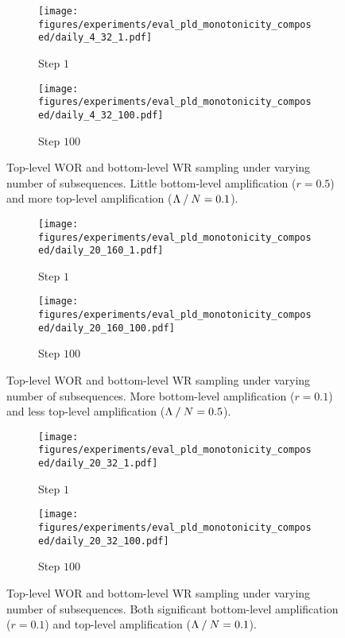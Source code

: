 \begin{figure*}[!ht]
\centering
\vskip 0.2in
    \begin{subfigure}{0.49\textwidth}
        \texttt{[image: figures/experiments/eval\_pld\_monotonicity\_composed/daily\_4\_32\_1.pdf]}
        \caption{Step $1$}
    \end{subfigure}
    \hfill
    \begin{subfigure}{0.49\textwidth}
        \texttt{[image: figures/experiments/eval\_pld\_monotonicity\_composed/daily\_4\_32\_100.pdf]}
        \caption{Step $100$}
    \end{subfigure}\caption{Top-level WOR and bottom-level WR sampling under varying number of subsequences.
    Little bottom-level amplification ($r = 0.5$) and more top-level amplification
    ($\Lambda \mathbin{/} N = 0.1$).
    }
    \label{fig:monotonicity_daily_appendix_container_1}
\vskip -0.2in
\end{figure*}
\begin{figure*}[!ht]
\centering
\vskip 0.2in
    \begin{subfigure}{0.49\textwidth}
        \texttt{[image: figures/experiments/eval\_pld\_monotonicity\_composed/daily\_20\_160\_1.pdf]}
        \caption{Step $1$}
    \end{subfigure}
    \hfill
    \begin{subfigure}{0.49\textwidth}
        \texttt{[image: figures/experiments/eval\_pld\_monotonicity\_composed/daily\_20\_160\_100.pdf]}
        \caption{Step $100$}
    \end{subfigure}\caption{Top-level WOR and bottom-level WR sampling under varying number of subsequences.
    More bottom-level amplification ($r = 0.1$) and less top-level amplification
    ($\Lambda \mathbin{/} N = 0.5$).}
    \label{fig:monotonicity_daily_appendix_container_2}
\vskip -0.2in
\end{figure*}
\begin{figure*}[!ht]
\centering
\vskip 0.2in
    \begin{subfigure}{0.49\textwidth}
        \texttt{[image: figures/experiments/eval\_pld\_monotonicity\_composed/daily\_20\_32\_1.pdf]}
        \caption{Step $1$}
    \end{subfigure}
    \hfill
    \begin{subfigure}{0.49\textwidth}
        \texttt{[image: figures/experiments/eval\_pld\_monotonicity\_composed/daily\_20\_32\_100.pdf]}
        \caption{Step $100$}
    \end{subfigure}\caption{Top-level WOR and bottom-level WR sampling under varying number of subsequences.
    Both significant bottom-level amplification ($r = 0.1$) and top-level amplification
    ($\Lambda \mathbin{/} N = 0.1$).}
    \label{fig:monotonicity_daily_appendix_container_3}
\vskip -0.2in
\end{figure*}

